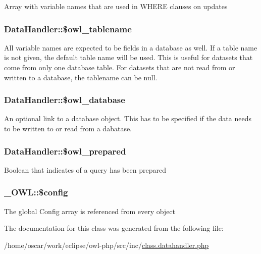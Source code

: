 Array with variable names that are used in WHERE clauses on updates \hypertarget{classDataHandler_24620784bde262bdd02227962d3b9605}{
\subsubsection{\setlength{\rightskip}{0pt plus 5cm}DataHandler::\$owl\_\-tablename}}
\label{classDataHandler_24620784bde262bdd02227962d3b9605}


All variable names are expected to be fields in a database as well. If a table name is not given, the default table name will be used. This is useful for datasets that come from only one database table. For datasets that are not read from or written to a database, the tablename can be null. \hypertarget{classDataHandler_3ac49aa018e0ebe4c74f5a636d455a8b}{
\subsubsection{\setlength{\rightskip}{0pt plus 5cm}DataHandler::\$owl\_\-database}}
\label{classDataHandler_3ac49aa018e0ebe4c74f5a636d455a8b}


An optional link to a database object. This has to be specified if the data needs to be written to or read from a dabatase. \hypertarget{classDataHandler_e6093d21291ed3ab3183e11962452928}{
\subsubsection{\setlength{\rightskip}{0pt plus 5cm}DataHandler::\$owl\_\-prepared}}
\label{classDataHandler_e6093d21291ed3ab3183e11962452928}


Boolean that indicates of a query has been prepared \hypertarget{class__OWL_f37a011667dda12fc417a68a6f3077d1}{
\subsubsection{\setlength{\rightskip}{0pt plus 5cm}\_\-OWL::\$config}}
\label{class__OWL_f37a011667dda12fc417a68a6f3077d1}


The global Config array is referenced from every object 

The documentation for this class was generated from the following file:\begin{CompactItemize}
\item 
/home/oscar/work/eclipse/owl-php/src/inc/\hyperlink{class_8datahandler_8php}{class.datahandler.php}\end{CompactItemize}

